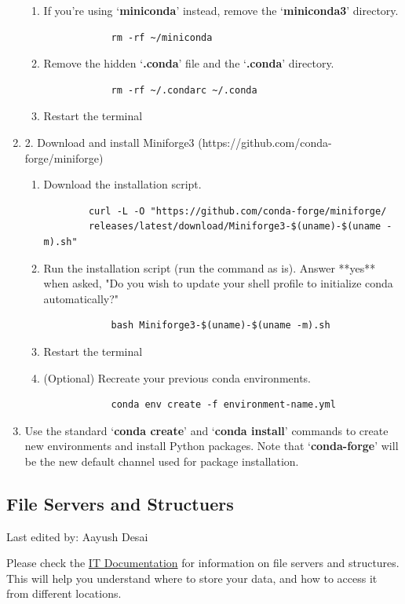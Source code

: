 \documentclass{article}
\newcommand{\setlasteditor}[1]{\gdef\lasteditor{#1}}
\newcommand{\lastedited}{%
    \vspace{1mm} {\footnotesize Last edited by: \lasteditor} \vspace{3mm}
    \newline

}
\begin{document}
\begin{enumerate}
\begin{enumerate}
        \item If you're using `\textbf{miniconda}' instead, remove the `\textbf{miniconda3}' directory.
        \begin{verbatim}
            rm -rf ~/miniconda
        \end{verbatim}
        \item Remove the hidden `\textbf{.conda}' file and the `\textbf{.conda}' directory.
        \begin{verbatim}
            rm -rf ~/.condarc ~/.conda
        \end{verbatim}
        \item Restart the terminal
    \end{enumerate}
    \item 2. Download and install Miniforge3 (https://github.com/conda-forge/miniforge)
    \begin{enumerate}
        \item Download the installation script.
        \begin{verbatim}
        curl -L -O "https://github.com/conda-forge/miniforge/
        releases/latest/download/Miniforge3-$(uname)-$(uname -m).sh"
        \end{verbatim}
        \item Run the installation script (run the command as is). Answer **yes** when asked, "Do you wish to update your shell profile to initialize conda automatically?"
        \begin{verbatim}
            bash Miniforge3-$(uname)-$(uname -m).sh
        \end{verbatim}
        \item Restart the terminal
        \item (Optional) Recreate your previous conda environments.
        \begin{verbatim}
            conda env create -f environment-name.yml
        \end{verbatim}
    \end{enumerate}
    \item Use the standard `\textbf{conda create}' and `\textbf{conda install}' commands to create new environments and install Python packages. Note that `\textbf{conda-forge}' will be the new default channel used for package installation.
\end{enumerate}

\subsection{File Servers and Structuers}
\setlasteditor{Aayush Desai}
\lastedited
\noindent
Please check the \href{https://it.pages.ist.ac.at/docs/it-documentation/fileservers/}{IT Documentation} for information on file servers and structures. This will help you understand where to store your data, and how to access it from different locations.
\end{document}
